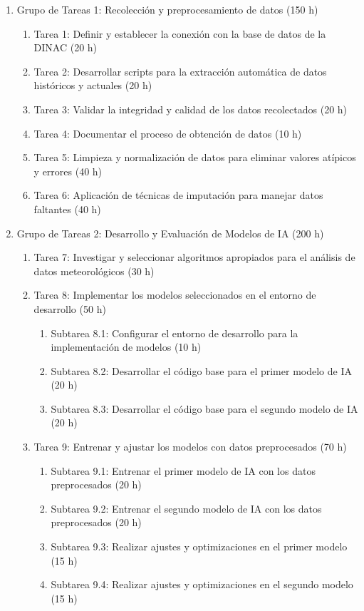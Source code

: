 \documentclass[
11pt, %
codirector, %
]{charter}
\begin{document}
\begin{enumerate}
\item Grupo de Tareas 1: Recolección y preprocesamiento de datos (150 h)
	\begin{enumerate}
	\item Tarea 1: Definir y establecer la conexión con la base de datos de la DINAC (20 h)
	\item Tarea 2: Desarrollar scripts para la extracción automática de datos históricos y actuales (20 h)
	\item Tarea 3: Validar la integridad y calidad de los datos recolectados (20 h)
	\item Tarea 4: Documentar el proceso de obtención de datos (10 h)
	\item Tarea 5: Limpieza y normalización de datos para eliminar valores atípicos y errores (40 h)
	\item Tarea 6: Aplicación de técnicas de imputación para manejar datos faltantes (40 h)
	\end{enumerate}
\item Grupo de Tareas 2: Desarrollo y Evaluación de Modelos de IA (200 h)
	\begin{enumerate}
	\item Tarea 7: Investigar y seleccionar algoritmos apropiados para el análisis de datos meteorológicos (30 h)
	\item Tarea 8: Implementar los modelos seleccionados en el entorno de desarrollo (50 h)
	\begin{enumerate}
	\item Subtarea 8.1: Configurar el entorno de desarrollo para la implementación de modelos (10 h)	
	\item Subtarea 8.2: Desarrollar el código base para el primer modelo de IA (20 h)
	\item Subtarea 8.3: Desarrollar el código base para el segundo modelo de IA (20 h)
	\end{enumerate}		
	\item Tarea 9: Entrenar y ajustar los modelos con datos preprocesados (70 h)
	\begin{enumerate}
	\item Subtarea 9.1: Entrenar el primer modelo de IA con los datos preprocesados (20 h)
	\item Subtarea 9.2: Entrenar el segundo modelo de IA con los datos preprocesados (20 h)
	\item Subtarea 9.3: Realizar ajustes y optimizaciones en el primer modelo (15 h)
	\item Subtarea 9.4: Realizar ajustes y optimizaciones en el segundo modelo (15 h)

\end{enumerate}
\end{enumerate}
\end{enumerate}
\end{document}
